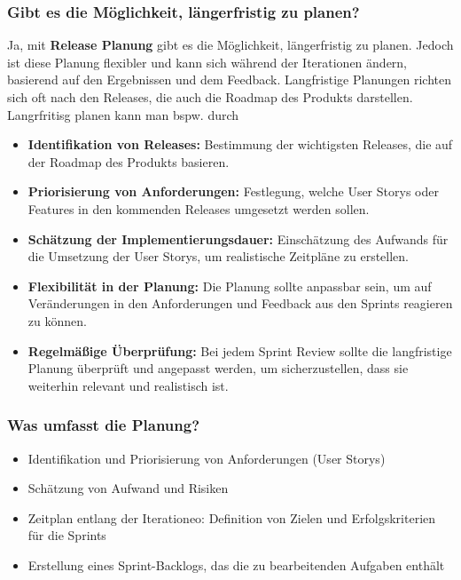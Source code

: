 \documentclass[main.tex]{subfiles}
\begin{document}
\subsubsection*{Gibt es die Möglichkeit, längerfristig zu planen?} %
Ja, mit \textbf{Release Planung} gibt es die Möglichkeit, längerfristig zu planen. Jedoch ist diese Planung flexibler und kann sich während der Iterationen ändern, basierend auf den Ergebnissen und dem Feedback. Langfristige Planungen richten sich oft nach den Releases, die auch die Roadmap des Produkts darstellen. \\ 
Langrfritisg planen kann man bspw. durch 
\begin{itemize}
    \item \textbf{Identifikation von Releases:} Bestimmung der wichtigsten Releases, die auf der Roadmap des Produkts basieren.
    \item \textbf{Priorisierung von Anforderungen:} Festlegung, welche \glspl{User Story} oder Features in den kommenden Releases umgesetzt werden sollen.
    \item \textbf{Schätzung der Implementierungsdauer:} Einschätzung des Aufwands für die Umsetzung der \glspl{User Story}, um realistische Zeitpläne zu erstellen.
    \item \textbf{Flexibilität in der Planung:} Die Planung sollte anpassbar sein, um auf Veränderungen in den Anforderungen und Feedback aus den \glspl{Sprint} reagieren zu können.
    \item \textbf{Regelmäßige Überprüfung:} Bei jedem \gls{Sprint Review} sollte die langfristige Planung überprüft und angepasst werden, um sicherzustellen, dass sie weiterhin relevant und realistisch ist.
\end{itemize}
\subsubsection*{Was umfasst die Planung?} %
\begin{itemize}
    \item Identifikation und Priorisierung von Anforderungen (\glspl{User Story})
    \item Schätzung von Aufwand und Risiken
    \item Zeitplan entlang der Iterationeo: Definition von Zielen und Erfolgskriterien für die \glspl{Sprint}
    \item Erstellung eines \gls{Sprint}-Backlogs, das die zu bearbeitenden Aufgaben enthält
\end{itemize}
\end{document}
